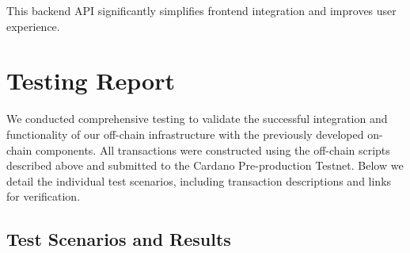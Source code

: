 \documentclass{article}
\begin{document}
This backend API significantly simplifies frontend integration and improves user experience.

\section{Testing Report}

We conducted comprehensive testing to validate the successful integration and functionality of our off-chain infrastructure with the previously developed on-chain components. All transactions were constructed using the off-chain scripts described above and submitted to the Cardano Pre-production Testnet. Below we detail the individual test scenarios, including transaction descriptions and links for verification.

\subsection{Test Scenarios and Results}
\end{document}
